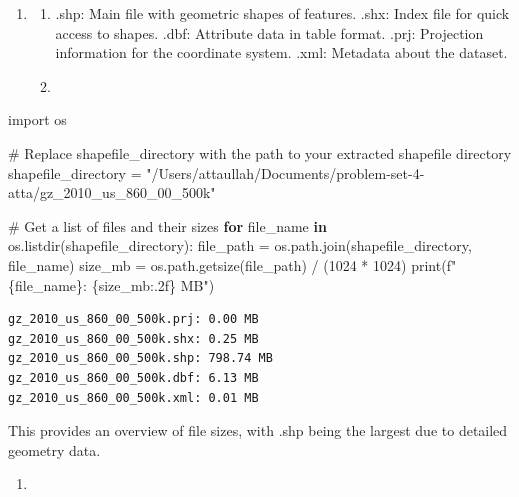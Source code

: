 \documentclass[
  letterpaper,
  DIV=11,
  numbers=noendperiod]{scrartcl}
\newenvironment{Shaded}{\begin{snugshade}}{\end{snugshade}}
\newcommand{\BuiltInTok}[1]{\textcolor[rgb]{0.00,0.23,0.31}{#1}}
\newcommand{\CommentTok}[1]{\textcolor[rgb]{0.37,0.37,0.37}{#1}}
\newcommand{\ControlFlowTok}[1]{\textcolor[rgb]{0.00,0.23,0.31}{\textbf{#1}}}
\newcommand{\DecValTok}[1]{\textcolor[rgb]{0.68,0.00,0.00}{#1}}
\newcommand{\ImportTok}[1]{\textcolor[rgb]{0.00,0.46,0.62}{#1}}
\newcommand{\KeywordTok}[1]{\textcolor[rgb]{0.00,0.23,0.31}{\textbf{#1}}}
\newcommand{\NormalTok}[1]{\textcolor[rgb]{0.00,0.23,0.31}{#1}}
\newcommand{\OperatorTok}[1]{\textcolor[rgb]{0.37,0.37,0.37}{#1}}
\newcommand{\SpecialCharTok}[1]{\textcolor[rgb]{0.37,0.37,0.37}{#1}}
\newcommand{\SpecialStringTok}[1]{\textcolor[rgb]{0.13,0.47,0.30}{#1}}
\newcommand{\StringTok}[1]{\textcolor[rgb]{0.13,0.47,0.30}{#1}}
\providecommand{\tightlist}{%
  \setlength{\itemsep}{0pt}\setlength{\parskip}{0pt}}\usepackage{longtable,booktabs,array}
\begin{document}
\begin{enumerate}
\def\labelenumi{\arabic{enumi}.}
\tightlist
\item
  \begin{enumerate}
  \def\labelenumii{\alph{enumii}.}
  \tightlist
  \item
    .shp: Main file with geometric shapes of features. .shx: Index file
    for quick access to shapes. .dbf: Attribute data in table format.
    .prj: Projection information for the coordinate system. .xml:
    Metadata about the dataset.\\
  \item
  \end{enumerate}
\end{enumerate}

\begin{Shaded}
\begin{Highlighting}[]
\ImportTok{import}\NormalTok{ os}

\CommentTok{\# Replace \textquotesingle{}shapefile\_directory\textquotesingle{} with the path to your extracted shapefile directory}
\NormalTok{shapefile\_directory }\OperatorTok{=} \StringTok{"/Users/attaullah/Documents/problem{-}set{-}4{-}atta/gz\_2010\_us\_860\_00\_500k"}

\CommentTok{\# Get a list of files and their sizes}
\ControlFlowTok{for}\NormalTok{ file\_name }\KeywordTok{in}\NormalTok{ os.listdir(shapefile\_directory):}
\NormalTok{    file\_path }\OperatorTok{=}\NormalTok{ os.path.join(shapefile\_directory, file\_name)}
\NormalTok{    size\_mb }\OperatorTok{=}\NormalTok{ os.path.getsize(file\_path) }\OperatorTok{/}\NormalTok{ (}\DecValTok{1024} \OperatorTok{*} \DecValTok{1024}\NormalTok{)}
    \BuiltInTok{print}\NormalTok{(}\SpecialStringTok{f"}\SpecialCharTok{\{}\NormalTok{file\_name}\SpecialCharTok{\}}\SpecialStringTok{: }\SpecialCharTok{\{}\NormalTok{size\_mb}\SpecialCharTok{:.2f\}}\SpecialStringTok{ MB"}\NormalTok{)}
\end{Highlighting}
\end{Shaded}

\begin{verbatim}
gz_2010_us_860_00_500k.prj: 0.00 MB
gz_2010_us_860_00_500k.shx: 0.25 MB
gz_2010_us_860_00_500k.shp: 798.74 MB
gz_2010_us_860_00_500k.dbf: 6.13 MB
gz_2010_us_860_00_500k.xml: 0.01 MB
\end{verbatim}

This provides an overview of file sizes, with .shp being the largest due
to detailed geometry data.

\begin{enumerate}
\def\labelenumi{\arabic{enumi}.}
\setcounter{enumi}{1}
\tightlist
\item
\end{enumerate}
\end{document}
